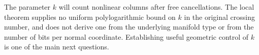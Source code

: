 The parameter $k$ will count nonlinear columns after free cancellations.
The local theorem supplies no uniform polylogarithmic bound on $k$ in
the original crossing number, and does not derive one from the underlying
manifold type or from the number of bits per normal coordinate. Establishing useful
geometric control of $k$ is one of the main next questions.
